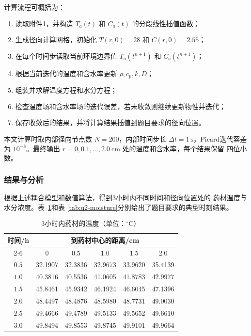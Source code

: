 \documentclass[12pt,a4paper]{article}
\begin{document}
\begin{center}
计算流程可概括为：

\begin{enumerate}
\item 读取附件1，并构造 $T_a(t)$ 和 $C_a(t)$ 的分段线性插值函数；
\item 生成径向计算网格，初始化 $T(r,0)=28$ 和 $C(r,0)=2.55$；
\item 在每个时间步读取当前环境边界值 $T_a(t^{n+1})$ 和
$C_a(t^{n+1})$；
\item 根据当前迭代的温度和含水率更新 $\rho,c_p,k,D$；
\item 组装并求解温度方程和水分方程；
\item 检查温度场和含水率场的迭代误差，若未收敛则继续更新物性并迭代；
\item 保存收敛后的结果，并将计算结果插值到题目要求的径向位置。
\end{enumerate}

本文计算时取内部径向节点数 $N=200$，内部时间步长
$\Delta t=1\ \mathrm{s}$，Picard迭代容差为 $10^{-8}$。最终输出
$r=0,0.1,\ldots,2.0\ \mathrm{cm}$ 处的温度和含水率，每个结果保留
四位小数。

\subsubsection{结果与分析}

根据上述耦合模型和数值算法，得到3小时内不同时间和径向位置处的
药材温度与水分浓度。表~\ref{tab:q2-temperature}和表
\ref{tab:q2-moisture}分别给出了题目要求的典型时刻结果。

\begin{table}[H]
\centering
\caption{3小时内药材的温度（单位：$^\circ$C）}
\label{tab:q2-temperature}
\begin{tabular}{cccccc}
\toprule
\multirow{2}{*}{时间/h}
& \multicolumn{5}{c}{到药材中心的距离/cm}\\
\cmidrule(lr){2-6}
& $0$ & $0.5$ & $1.0$ & $1.5$ & $2.0$\\
\midrule
$0.5$ & 32.1907 & 32.3836 & 32.9673 & 33.9620 & 35.4139\\
$1.0$ & 40.3816 & 40.5536 & 41.0605 & 41.8783 & 42.9977\\
$1.5$ & 45.8461 & 45.9342 & 46.1924 & 46.6045 & 47.1396\\
$2.0$ & 48.4497 & 48.4876 & 48.5980 & 48.7731 & 49.0030\\
$2.5$ & 49.4666 & 49.4789 & 49.5133 & 49.5652 & 49.6610\\
$3.0$ & 49.8494 & 49.8553 & 49.8745 & 49.9101 & 49.9664\\
\bottomrule
\end{tabular}
\end{table}


\end{center}
\end{document}
